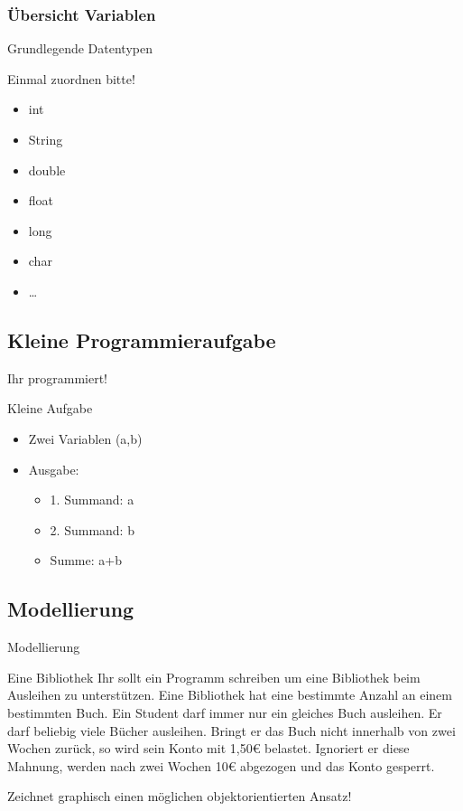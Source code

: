 \documentclass{beamer}
\begin{document}
\subsubsection{Übersicht Variablen}
\begin{frame}{Grundlegende Datentypen}
\begin{exampleblock}{Einmal zuordnen bitte!}
\begin{itemize}
\item int
\item String
\item double
\item float
\item long
\item char
\item \dots
\end{itemize}
\end{exampleblock}
\end{frame}

\subsection{Kleine Programmieraufgabe}
\begin{frame}{Ihr programmiert!}
\begin{exampleblock}{Kleine Aufgabe}
\begin{itemize}
\item Zwei Variablen (a,b)
\item Ausgabe:
\begin{itemize}
\item 1. Summand: a
\item 2. Summand: b
\item Summe: a+b
\end{itemize}
\end{itemize}
\end{exampleblock}
\end{frame}

\subsection{Modellierung}
\begin{frame}{Modellierung}
 \begin{exampleblock}{Eine Bibliothek}
 Ihr sollt ein Programm schreiben um eine Bibliothek beim Ausleihen zu unterstützen.
 Eine Bibliothek hat eine bestimmte Anzahl an einem bestimmten Buch. 
 Ein Student darf immer nur ein gleiches Buch ausleihen.
 Er darf beliebig viele Bücher ausleihen.
 Bringt er das Buch nicht innerhalb von zwei Wochen zurück, so wird sein Konto mit 1,50€ belastet.
 Ignoriert er diese Mahnung, werden nach zwei Wochen 10€ abgezogen und das Konto gesperrt.
 \end{exampleblock}
Zeichnet graphisch einen möglichen objektorientierten Ansatz!
 \end{frame}
\end{document}
